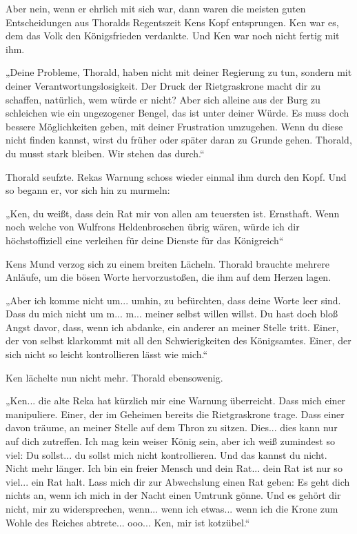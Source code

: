 Aber nein, wenn er ehrlich mit sich war, dann waren die meisten guten Entscheidungen aus Thoralds Regentszeit Kens Kopf entsprungen. Ken war es, dem das Volk den Königsfrieden verdankte. Und Ken war noch nicht fertig mit ihm.

„Deine Probleme, Thorald, haben nicht mit deiner Regierung zu tun, sondern mit deiner Verantwortungslosigkeit. Der Druck der Rietgraskrone macht dir zu schaffen, natürlich, wem würde er nicht? Aber sich alleine aus der Burg zu schleichen wie ein ungezogener Bengel, das ist unter deiner Würde. Es muss doch bessere Möglichkeiten geben, mit deiner Frustration umzugehen. Wenn du diese nicht finden kannst, wirst du früher oder später daran zu Grunde gehen. Thorald, du musst stark bleiben. Wir stehen das durch.“

Thorald seufzte. Rekas Warnung schoss wieder einmal ihm durch den Kopf. Und so begann er, vor sich hin zu murmeln:

„Ken, du weißt, dass dein Rat mir von allen am teuersten ist. Ernsthaft. Wenn noch welche von Wulfrons Heldenbroschen übrig wären, würde ich dir höchstoffiziell eine verleihen für deine Dienste für das Königreich“

Kens Mund verzog sich zu einem breiten Lächeln. Thorald brauchte mehrere Anläufe, um die bösen Worte hervorzustoßen, die ihm auf dem Herzen lagen.

„Aber ich komme nicht um... umhin, zu befürchten, dass deine Worte leer sind. Dass du mich nicht um m... m... meiner selbst willen willst. Du hast doch bloß Angst davor, dass, wenn ich abdanke, ein anderer an meiner Stelle tritt. Einer, der von selbst klarkommt mit all den Schwierigkeiten des Königsamtes. Einer, der sich nicht so leicht kontrollieren lässt wie mich.“

Ken lächelte nun nicht mehr. Thorald ebensowenig.

„Ken... die alte Reka hat kürzlich mir eine Warnung überreicht. Dass mich einer manipuliere. Einer, der im Geheimen bereits die Rietgraskrone trage. Dass einer davon träume, an meiner Stelle auf dem Thron zu sitzen. Dies... dies kann nur auf dich zutreffen. Ich mag kein weiser König sein, aber ich weiß zumindest so viel: Du sollst... du sollst mich nicht kontrollieren. Und das kannst du nicht. Nicht mehr länger. Ich bin ein freier Mensch und dein Rat... dein Rat ist nur so viel... ein Rat halt. Lass mich dir zur Abwechslung einen Rat geben: Es geht dich nichts an, wenn ich mich in der Nacht einen Umtrunk gönne. Und es gehört dir nicht, mir zu widersprechen, wenn... wenn ich etwas... wenn ich die Krone zum Wohle des Reiches abtrete... ooo... Ken, mir ist kotzübel.“

